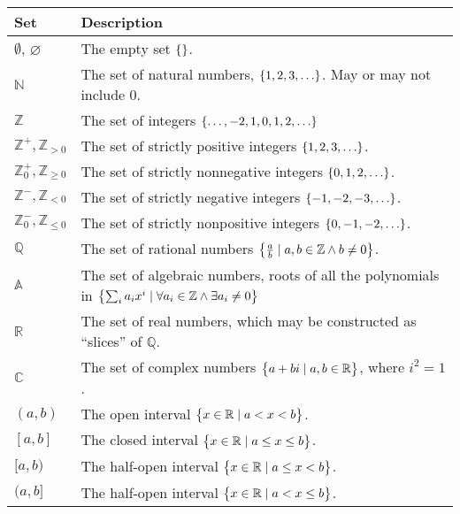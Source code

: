 \documentclass[a4paper,11pt]{article}
\begin{document}

    \begin{longtable}{ll}
    \toprule
    \bfseries Set & \bfseries Description \\
    \midrule
    \endhead
    $\emptyset$, $\varnothing$ & The empty set $\set{}$. \\
    $\mathbb{N}$ & The set of natural numbers, $\set{1, 2, 3, \ldots}$.
                   May or may not include $0$. \\
    $\mathbb{Z}$ & The set of integers $\set{\ldots, -2, 1, 0, 1, 2, \ldots}$ \\
    $\mathbb{Z}^+, \mathbb{Z}_{> 0}$ & The set of strictly positive integers
                   $\set{1, 2, 3, \ldots}$. \\
    $\mathbb{Z}^+_0, \mathbb{Z}_{\ge 0}$ &
                   The set of strictly nonnegative integers
                   $\set{0, 1, 2, \ldots}$. \\
    $\mathbb{Z}^-, \mathbb{Z}_{< 0}$ & The set of strictly negative integers
                   $\set{-1, -2, -3, \ldots}$. \\
    $\mathbb{Z}^-_0, \mathbb{Z}_{\le 0}$ &
                   The set of strictly nonpositive integers
                   $\set{0, -1, -2, \ldots}$. \\
    $\mathbb{Q}$ & The set of rational numbers
                   $\set{\frac ab \mid a, b \in \mathbb{Z} \land b \neq 0}$.\\
    $\mathbb{A}$ & The set of algebraic numbers, roots of all the polynomials in
                   $\set{\sum_i a_i x^i \mid \forall a_i \in \mathbb{Z} \land
                         \exists a_i \neq 0}$ \\
    $\mathbb{R}$ & The set of real numbers, which may be constructed as
                   ``slices'' of $\mathbb{Q}$. \\
    $\mathbb{C}$ & The set of complex numbers
                   $\set{a + bi \mid a, b \in \mathbb{R}}$, where $i^2 = 1$.\\
    $(a, b)$ & The open interval $\set{x \in \mathbb{R} \mid a < x < b}$.\\
    $[a, b]$ & The closed interval
               $\set{x \in \mathbb{R} \mid a \le x \le b}$.\\
    $[a, b)$ & The half-open interval
               $\set{x \in \mathbb{R} \mid a \le x < b}$.\\
    $(a, b]$ & The half-open interval
               $\set{x \in \mathbb{R} \mid a < x \le b}$.\\
    \bottomrule
    \end{longtable}
\end{document}
